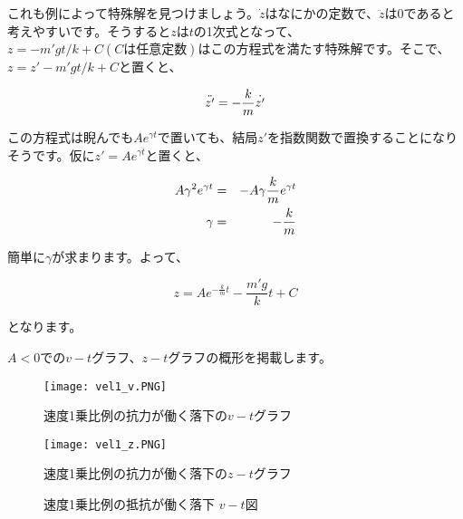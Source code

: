 これも例によって特殊解を見つけましょう。$\dot{z}$はなにかの定数で、$\ddot{z}$は$0$であると考えやすいです。そうすると$z$は$t$の1次式となって、$z=-m'gt/k + C (Cは任意定数)$はこの方程式を満たす特殊解です。そこで、$z = z' - m'gt/k + C$と置くと、

\begin{equation}
    \ddot{z'} =-\frac{k}{m}\dot{z'} \notag
\end{equation}

この方程式は睨んでも$Ae^{\gamma t}$で置いても、結局$z'$を指数関数で置換することになりそうです。仮に$z'=Ae^{\gamma t}$と置くと、

\begin{eqnarray}
    A\gamma^2 e^{\gamma t} &=& -A\gamma\frac{k}{m}e^{\gamma t} \notag \\
    \gamma &=& -\frac{k}{m} \notag
\end{eqnarray}

簡単に$\gamma$が求まります。よって、

\begin{equation}
    z = Ae^{-\frac{k}{m}t} - \frac{m'g}{k}t + C 
\end{equation}

となります。

$A<0$での$v-t$グラフ、$z-t$グラフの概形を掲載します。


\begin{figure}[!ht]
  \centering
  \texttt{[image: vel1\_v.PNG]}
  \caption{速度1乗比例の抗力が働く落下の$v-t$グラフ}
  \label{fig:vel1_v}
\end{figure}

\begin{figure}[!ht]
  \centering
  \texttt{[image: vel1\_z.PNG]}
  \caption{速度1乗比例の抗力が働く落下の$z-t$グラフ}
  \label{fig:vel1_z}
\end{figure}
\fi

\begin{figure}[htbp]
\begin{center}
\caption{速度1乗比例の抵抗が働く落下 $v-t$図}
\end{center}
\end{figure}


